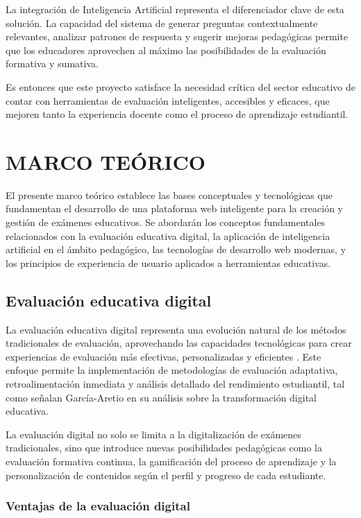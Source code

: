 \documentclass[12pt,a4paper]{report}
\begin{document}
La integración de Inteligencia Artificial representa el diferenciador clave de esta solución. La capacidad del sistema de generar preguntas contextualmente relevantes, analizar patrones de respuesta y sugerir mejoras pedagógicas permite que los educadores aprovechen al máximo las posibilidades de la evaluación formativa y sumativa.

Es entonces que este proyecto satisface la necesidad crítica del sector educativo de contar con herramientas de evaluación inteligentes, accesibles y eficaces, que mejoren tanto la experiencia docente como el proceso de aprendizaje estudiantil.

\chapter{MARCO TEÓRICO}

El presente marco teórico establece las bases conceptuales y tecnológicas que fundamentan el desarrollo de una plataforma web inteligente para la creación y gestión de exámenes educativos. Se abordarán los conceptos fundamentales relacionados con la evaluación educativa digital, la aplicación de inteligencia artificial en el ámbito pedagógico, las tecnologías de desarrollo web modernas, y los principios de experiencia de usuario aplicados a herramientas educativas.

\section{Evaluación educativa digital}

La evaluación educativa digital representa una evolución natural de los métodos tradicionales de evaluación, aprovechando las capacidades tecnológicas para crear experiencias de evaluación más efectivas, personalizadas y eficientes \citep{cabrera2020}. Este enfoque permite la implementación de metodologías de evaluación adaptativa, retroalimentación inmediata y análisis detallado del rendimiento estudiantil, tal como señalan García-Aretio \citep{garcia2021} en su análisis sobre la transformación digital educativa.

La evaluación digital no solo se limita a la digitalización de exámenes tradicionales, sino que introduce nuevas posibilidades pedagógicas como la evaluación formativa continua, la gamificación del proceso de aprendizaje y la personalización de contenidos según el perfil y progreso de cada estudiante.

\subsection{Ventajas de la evaluación digital}
\end{document}
